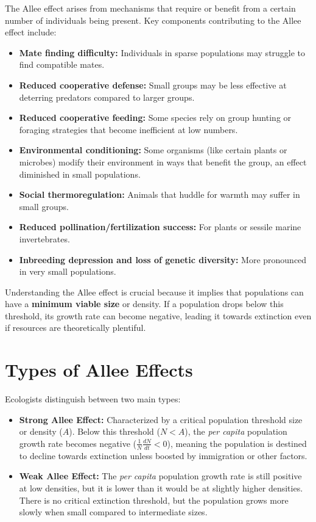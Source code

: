\documentclass{article}
\begin{document}
The Allee effect arises from mechanisms that require or benefit from a certain number of individuals being present. Key components contributing to the Allee effect include:
\begin{itemize}
    \item \textbf{Mate finding difficulty:} Individuals in sparse populations may struggle to find compatible mates.
    \item \textbf{Reduced cooperative defense:} Small groups may be less effective at deterring predators compared to larger groups.
    \item \textbf{Reduced cooperative feeding:} Some species rely on group hunting or foraging strategies that become inefficient at low numbers.
    \item \textbf{Environmental conditioning:} Some organisms (like certain plants or microbes) modify their environment in ways that benefit the group, an effect diminished in small populations.
    \item \textbf{Social thermoregulation:} Animals that huddle for warmth may suffer in small groups.
    \item \textbf{Reduced pollination/fertilization success:} For plants or sessile marine invertebrates.
    \item \textbf{Inbreeding depression and loss of genetic diversity:} More pronounced in very small populations.
\end{itemize}

Understanding the Allee effect is crucial because it implies that populations can have a \textbf{minimum viable size} or density. If a population drops below this threshold, its growth rate can become negative, leading it towards extinction even if resources are theoretically plentiful.

\section{Types of Allee Effects}

Ecologists distinguish between two main types:

\begin{itemize}
    \item \textbf{Strong Allee Effect:} Characterized by a critical population threshold size or density ($A$). Below this threshold ($N < A$), the \emph{per capita} population growth rate becomes negative ($\frac{1}{N}\frac{dN}{dt} < 0$), meaning the population is destined to decline towards extinction unless boosted by immigration or other factors.
    \item \textbf{Weak Allee Effect:} The \emph{per capita} population growth rate is still positive at low densities, but it is lower than it would be at slightly higher densities. There is no critical extinction threshold, but the population grows more slowly when small compared to intermediate sizes.
\end{itemize}
\end{document}
